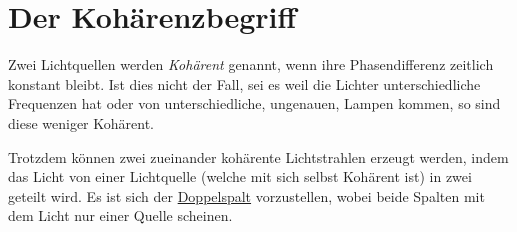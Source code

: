 \documentclass{article}
\begin{document}
\section{Der Kohärenzbegriff} 
Zwei Lichtquellen werden \emph{Kohärent} genannt, wenn ihre Phasendifferenz zeitlich konstant bleibt. Ist dies nicht der Fall, sei es weil die Lichter unterschiedliche Frequenzen hat oder von unterschiedliche, ungenauen, Lampen kommen, so sind diese weniger Kohärent.
 
Trotzdem können zwei zueinander kohärente Lichtstrahlen erzeugt werden, indem das Licht von einer Lichtquelle (welche mit sich selbst Kohärent ist) in zwei geteilt wird. Es ist sich der \hyperref[Der Doppelspalt]{Doppelspalt} vorzustellen, wobei beide Spalten mit dem Licht nur einer Quelle scheinen.
\end{document}
